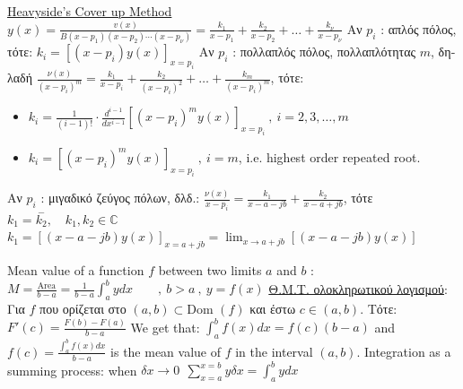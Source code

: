 \documentclass[12pt]{article}
\def\Dom{\text{Dom\ }} %
\begin{document}
\begin{flushleft}
	\uline{Heavyside's Cover up Method} \linebreak 
	\textbullet \quad $\displaystyle y(x) = \frac{v(x)}{B(x-p_1)(x-p_2)\cdots(x-p_{\nu})} = \frac{k_1}{x-p_1} + \frac{k_2}{x-p_2} + \ldots + \frac{k_{\nu}}{x-p_{\nu}} $ \linebreak 
	\textbullet \quad \textgreek{Αν} $p_i$  :  \textgreek{απλός πόλος, τότε}: $k_i = \left[(x-p_i)y(x)\right]_{x=p_i}$
	\textbullet \quad \textgreek{Αν} $p_i$  :  \textgreek{πολλαπλός πόλος, πολλαπλότητας} $m$, \textgreek{δηλαδή} $\displaystyle \frac{\nu(x)}{(x-p_i)^m} = \frac{k_1}{x-p_i} + \frac{k_2}{(x-p_i)^2} + \ldots + \frac{k_m}{(x-p_i)^m} $, \textgreek{τότε}:  
	\begin{itemize}
		\renewcommand{\labelitemi}{$\rightarrow$}
	\item	$\displaystyle k_i= \frac{1}{(i-1)!} \cdot \frac{d^{i-1}}{dx^{i-1}} \left[(x-p_i)^m y(x) \right]_{x=p_i} \ , \ i=2,3,\ldots, m$ 
	\item $\displaystyle k_i = \left[ (x-p_i)^m y(x) \right]_{x=p_i} \ , \ i=m$, i.e. highest order repeated root.  
	\end{itemize}
	\textbullet \quad \textgreek{Αν} $p_i$  :  \textgreek{μιγαδικό ζεύγος πόλων, δλδ.}: \linebreak 
	$\displaystyle \frac{\nu(x)}{x-p_i} = \frac{k_1}{x-a-jb} + \frac{k_2}{x-a+jb} $, \textgreek{τότε} $k_1 = \overset{-}{k_2},\quad k_1, k_2 \in \mathbb{C} $ \linebreak 
	$\displaystyle k_1 = \left[ (x-a-jb) y(x) \right]_{x=a+jb} = \lim_{x\to a+jb} \left[(x-a-jb) y(x) \right] $ \linebreak 
	
	\textbullet \quad Mean value of a function $f$ between two limits $a$ and $b$  :  \linebreak 
	$\displaystyle M = \frac{\text{Area}}{b-a} = \frac{1}{b-a} \int_a^b y dx \qquad , \ b>a\ , \ y=f(x)$ \linebreak 
	\textbullet \quad \uline{\textgreek{Θ.Μ.Τ. ολοκληρωτικού λογισμού}}: \textgreek{Για} $f$ \textgreek{που ορίζεται στο} $(a,b) \subset \Dom (f)$ \textgreek{και έστω} $c \in (a,b)$. \textgreek{Τότε}: $\displaystyle F'(c) = \frac{F(b) - F(a)}{b-a} $ \linebreak 
	\textbullet \quad We get that: $\displaystyle \int_a^b f(x) dx = f(c) (b-a) $ and $\displaystyle f(c) = \frac{\int_a^b f(x) dx}{b-a} $ is the mean value of $f$ in the interval $(a,b)$. \linebreak 
	\textbullet \quad Integration as a summing process: \linebreak 
	when $\displaystyle \delta x \rightarrow 0 \: \ \sum \limits_{x=a}^{x=b} y \delta x = \int_a^b ydx$ \linebreak 
	

\end{flushleft}
\end{document}
